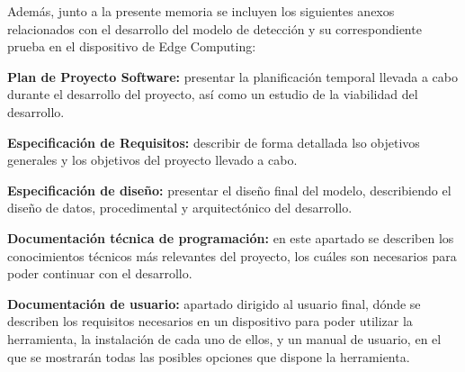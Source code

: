Además, junto a la presente memoria se incluyen los siguientes anexos relacionados con el desarrollo del modelo de detección y su correspondiente prueba en el dispositivo de Edge Computing:
\begin{list}{\textbullet}{ %
    \addtolength{\itemsep}{-2mm} %
    \setlength{\itemindent}{2mm}}

    \item \textbf{Plan de Proyecto Software:} presentar la planificación temporal llevada a cabo durante el desarrollo del proyecto, así como un estudio de la viabilidad del desarrollo.
    \item \textbf{Especificación de Requisitos:} describir de forma detallada lso objetivos generales y los objetivos del proyecto llevado a cabo.
    \item \textbf{Especificación de diseño:} presentar el diseño final del modelo, describiendo el diseño de datos, procedimental y arquitectónico del desarrollo.
    \item \textbf{Documentación técnica de programación:} en este apartado se describen los conocimientos técnicos más relevantes del proyecto, los cuáles son necesarios para poder continuar con el desarrollo.
    \item \textbf{Documentación de usuario:} apartado dirigido al usuario final, dónde se describen los requisitos necesarios en un dispositivo para poder utilizar la herramienta, la instalación de cada uno de ellos, y un manual de usuario, en el que se mostrarán todas las posibles opciones que dispone la herramienta.
\end{list}